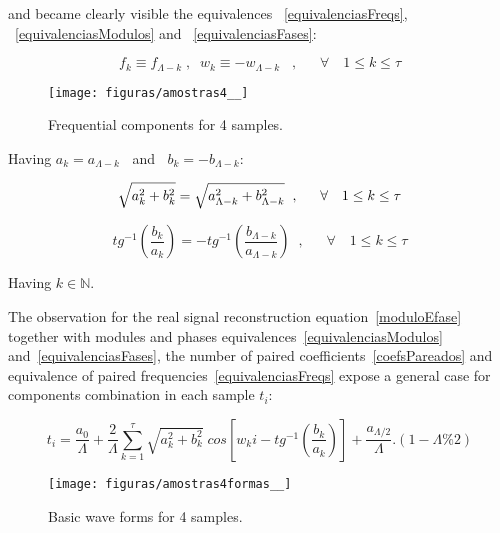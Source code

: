 \documentclass[
 aip,
 jmp,
 amsmath,amssymb,
 reprint,
]{revtex4-1}
\begin{document}
and became clearly visible the equivalences ~\ref{equivalenciasFreqs}, ~\ref{equivalenciasModulos} and ~\ref{equivalenciasFases}:

\begin{equation}\label{equivalenciasFreqs}
f_{k}\equiv f_{\Lambda-k}\;, \;\; w_{k}\equiv-w_{\Lambda-k}\;\;\;, \quad \;\; \forall \quad 1 \leq k \leq \tau  
\end{equation}

\begin{figure}[h!]
    \centering
        \texttt{[image: figuras/amostras4\_\_]}
    \caption{Frequential components for 4 samples.}
        \label{fig:amostras4}
\end{figure}

Having $a_k = a_{\Lambda -k}\;\;$ and $\;\;b_k = - b_{\Lambda -k}$:

\begin{equation}\label{equivalenciasModulos}
\sqrt{a_k^2 + b_k^2} = \sqrt{a_{\Lambda - k}^2 + b_{\Lambda -k}^2} \;\;, \quad \;\; \forall \quad 1 \leq k \leq \tau  \\
\end{equation}

\begin{equation}\label{equivalenciasFases}
tg^{-1}\left(\frac{b_k}{a_k}\right)=-tg^{-1}\left(\frac{b_{\Lambda -k}}{a_{\Lambda - k}}\right)\;\;,\quad \;\; \forall \quad 1 \leq k \leq \tau
\end{equation}

Having $k \in \mathbb{N}$.

The observation for the real signal reconstruction equation~\ref{moduloEfase} together with modules and phases equivalences~\ref{equivalenciasModulos} and~\ref{equivalenciasFases}, the number of paired coefficients~\ref{coefsPareados} and equivalence of paired frequencies~\ref{equivalenciasFreqs} expose a general case for components combination in each sample $t_i$:

\begin{equation}\label{eq:reconsCompleta}
t_i = \frac{a_0}{\Lambda} + \frac{2}{\Lambda}\sum_{k=1}^{\tau}\sqrt{a_k^2 + b_k^2} \; cos\left[w_k i - tg^{-1}\left(\frac{b_k}{a_k}\right)\right]+ \frac{ a_{\Lambda/2}}{\Lambda}.(1-\Lambda\% 2)
\end{equation}

\begin{figure}[h!]
    \centering
        \texttt{[image: figuras/amostras4formas\_\_]}
    \caption{Basic wave forms for 4 samples.}
        \label{fig:formas4}
\end{figure}
\end{document}
